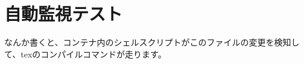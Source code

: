 \documentclass[a4paper]{article} %
\begin{document}
  \section{自動監視テスト}
  なんか書くと、コンテナ内のシェルスクリプトがこのファイルの変更を検知して、texのコンパイルコマンドが走ります。

  
  
\end{document}
